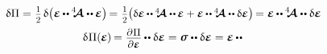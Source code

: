 \begin{minipage}{\linewidth}
\begin{itemize}
{{\nopagebreak\vspace{.1em}\begin{equation*}
\begin{gathered}
\variation{\potential}
= \hspace{.1ex}
\smash{\smalldisplaystyleonehalf} \hspace{.25ex}
\variation{ \bigl(
   \infinitesimaldeformation
   \hspace{-0.1ex} \dotdotp \hspace{-0.1ex}
   \stiffnesstensor
   \dotdotp \hspace{-0.1ex}
   \infinitesimaldeformation
\bigr)
} \hspace{-0.25ex}
= \hspace{.1ex}
\smash{\smalldisplaystyleonehalf}
\hspace{-0.1ex} \bigl(
\scalebox{.95}{$
   \variation{\infinitesimaldeformation}
   \hspace{-0.1ex} \dotdotp \hspace{-0.1ex}
   \stiffnesstensor
   \dotdotp \hspace{-0.1ex}
   \infinitesimaldeformation
   +
   \infinitesimaldeformation
   \hspace{-0.1ex} \dotdotp \hspace{-0.1ex}
   \stiffnesstensor
   \dotdotp
   \variation{\infinitesimaldeformation}
$}
\bigr)
\hspace{-0.25ex} =
\tikzmark{beginLinearStressAsDeformationAndStiffness}
\infinitesimaldeformation
\hspace{-0.1ex} \dotdotp \hspace{-0.1ex}
\stiffnesstensor
\tikzmark{endLinearStressAsDeformationAndStiffness}
\dotdotp
\variation{\infinitesimaldeformation}
\\[.3em]
%
\variation{\hspace{.1ex}\potential}
( \hspace{-0.1ex}
    \infinitesimaldeformation
\hspace{-0.1ex} ) \hspace{-0.2ex}
= \scalebox{.9}{$
    \displaystyle\frac{
        \raisemath{-0.16em}
        {\partial \hspace{.1ex} \potential}}
        {\partial \infinitesimaldeformation}
    $} \hspace{-0.1ex}
\dotdotp
\variation{\infinitesimaldeformation}
= \linearstress
\dotdotp
\variation{\infinitesimaldeformation}
= \infinitesimaldeformation
\hspace{-0.1ex} \dotdotp \hspace{-0.1ex}

\end{gathered}
\end{equation*}}}
\end{itemize}
\end{minipage}
